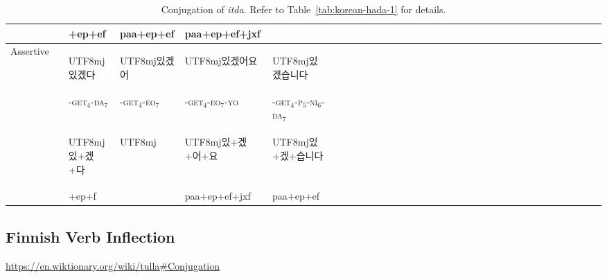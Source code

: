 \documentclass[11pt,letterpaper]{article}
\newcommand{\korean}[1]{\begin{CJK}{UTF8}{mj}#1\end{CJK}}
\begin{document}
\begin{table}[]
\begin{tabular}{llllllllllllllllllllllllllllllllll}
         &  & +ep+ef & paa+ep+ef &  paa+ep+ef+jxf\\
         \hline
\multirow{3}{*}{Assertive} &  & \korean{있겠다} & \korean{있겠어} & \korean{있겠어요} & \korean{있겠습니다} \\
&& -\textsc{get}$_4$-\textsc{da}$_7$ & -\textsc{get}$_4$-\textsc{eo}$_7$ & -\textsc{get}$_4$-\textsc{eo}$_7$-\textsc{yo} & -\textsc{get}$_4$-\textsc{p}$_5$-\textsc{ni}$_6$-\textsc{da}$_7$ \\
         &  & \korean{있+겠+다} & \korean{} & \korean{있+겠+어+요} & \korean{있+겠+습니다}\\
         &  & +ep+f             &           & paa+ep+ef+jxf & paa+ep+ef\\
    \end{tabular}
    \caption{Conjugation of \textit{itda}. Refer to Table~\ref{tab:korean-hada-1} for details.}
    \label{tab:kroean-itda}
\end{table}




\subsection{Finnish Verb Inflection}

\url{https://en.wiktionary.org/wiki/tulla#Conjugation}
\end{document}
